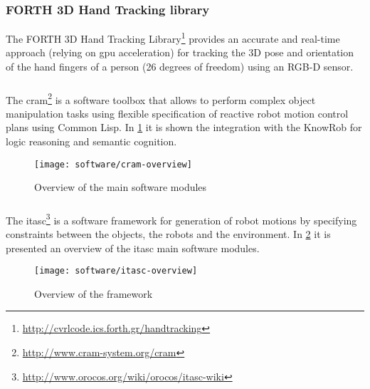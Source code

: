 \subsubsection{FORTH 3D Hand Tracking library}

The FORTH 3D Hand Tracking Library\footnote{\url{http://cvrlcode.ics.forth.gr/handtracking}} \cite{Oikonomidis2011,Kyriazis2012} provides an accurate and real-time approach (relying on \gls{gpu} acceleration) for tracking the 3D pose and orientation of the hand fingers of a person (26 degrees of freedom) using an RGB-D sensor.


\subsubsection{}

The \gls{cram}\footnote{\url{http://www.cram-system.org/cram}} \cite{Beetz2010} is a software toolbox that allows to perform complex object manipulation tasks using flexible specification of reactive robot motion control plans using Common Lisp. In \cref{fig:cram-overview} it is shown the integration with the KnowRob for logic reasoning and semantic cognition.

\begin{figure}[H]
	\centering
	\texttt{[image: software/cram-overview]}
	\caption{Overview of the  main software modules}
	\label{fig:cram-overview}
\end{figure}


\subsubsection{}

The \gls{itasc}\footnote{\url{http://www.orocos.org/wiki/orocos/itasc-wiki}} \cite{DeSchutter-ijrr2007} is a software framework for generation of robot motions by specifying constraints between the objects, the robots and the environment. In \cref{fig:itasc-overview} it is presented an overview of the \gls{itasc} main software modules.

\begin{figure}[H]
	\centering
	\texttt{[image: software/itasc-overview]}
	\caption[Overview of the  framework]{Overview of the  framework\protect\footnotemark}
	\label{fig:itasc-overview}
\end{figure}




